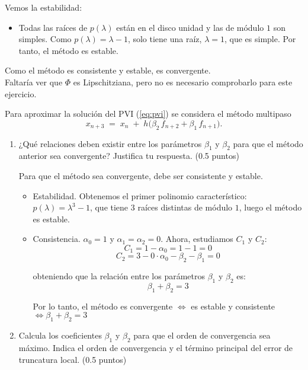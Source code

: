 \documentclass[12pt]{article}
\begin{document}
\begin{ejercicio}[2 puntos]
      Vemos la estabilidad:

      \begin{itemize}
        \item Todas las raíces de $p(\lambda)$ están en el disco unidad y las de módulo $1$ son simples. Como $p(\lambda) = \lambda - 1$, solo tiene una raíz, $\lambda = 1$, que es simple. Por tanto, el método es estable.
      \end{itemize}

      Como el método es consistente y estable, es convergente. \\

      Faltaría ver que $\Phi$ es Lipschitziana, pero no es necesario comprobarlo para este ejercicio.
    \end{ejercicio}     

    \begin{ejercicio}[2 puntos]
      Para aproximar la solución del PVI (\ref{eq:pvi}) se considera el método multipaso
      \[
      x_{n+3} \;=\; x_n \;+\; h\bigl(\beta_2\,f_{n+2} + \beta_1\,f_{n+1}\bigr).
      \]
      \begin{enumerate}
        \item ¿Qué relaciones deben existir entre los parámetros $\beta_1$ y $\beta_2$ para que el método anterior sea convergente? Justifica tu respuesta. (0.5 puntos)
        
        Para que el método sea convergente, debe ser consistente y estable. 

        \begin{itemize}
          \item Estabilidad. Obtenemos el primer polinomio característico: $p(\lambda) = \lambda^3 - 1$, que tiene $3$ raíces distintas de módulo $1$, luego el método es estable.
          \item Consistencia. $\alpha_0 = 1$ y $\alpha_1 = \alpha_2 = 0$. Ahora, estudiamos $C_1$ y $C_2$:
          $$C_1 = 1 - \alpha_0 = 1 - 1 = 0$$
          $$C_2 = 3 - 0 \cdot \alpha_0 - \beta_2 - \beta_1 = 0$$

          obteniendo que la relación entre los parámetros $\beta_1$ y $\beta_2$ es:
          $$\beta_1 + \beta_2 = 3$$

          Por lo tanto, el método es convergente $\iff$ es estable y consistente $\iff \beta_1 + \beta_2 = 3$ 
        \end{itemize}

        \item Calcula los coeficientes $\beta_1$ y $\beta_2$ para que el orden de convergencia sea máximo. Indica el orden de convergencia y el término principal del error de truncatura local. (0.5 puntos)
        

\end{enumerate}
\end{ejercicio}
\end{document}

